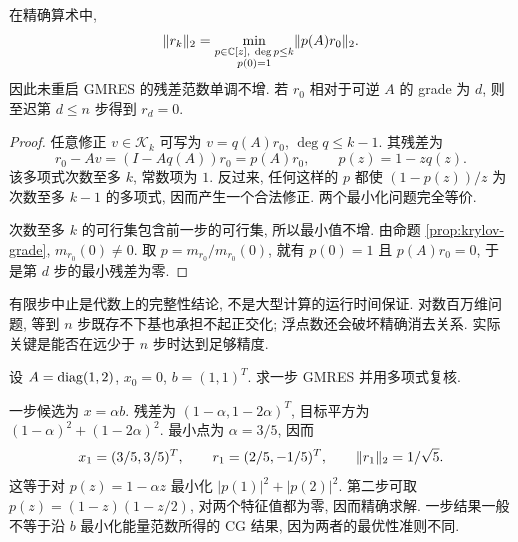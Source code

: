 \begin{theorem}\label{thm:gmres-polynomial}
在精确算术中,
\begin{equation}\label{eq:gmres-poly-min}
\lVert r_k\rVert_2=
\min_{\substack{p\in\mathbb C[z],\ \deg p\le k\\p(0)=1}}
\lVert p(A)r_0\rVert_2.
\end{equation}
因此未重启 GMRES 的残差范数单调不增. 若 $r_0$ 相对于可逆 $A$ 的 grade 为 $d$, 则至迟第 $d\le n$ 步得到 $r_d=0$.
\end{theorem}
\begin{proof}
任意修正 $v\in\mathcal K_k$ 可写为 $v=q(A)r_0$, $\deg q\le k-1$. 其残差为
\[
r_0-Av=(I-Aq(A))r_0=p(A)r_0,\qquad p(z)=1-zq(z).
\]
该多项式次数至多 $k$, 常数项为 $1$. 反过来, 任何这样的 $p$ 都使 $(1-p(z))/z$ 为次数至多 $k-1$ 的多项式, 因而产生一个合法修正. 两个最小化问题完全等价.

次数至多 $k$ 的可行集包含前一步的可行集, 所以最小值不增. 由命题 \ref{prop:krylov-grade}, $m_{r_0}(0)\ne0$. 取 $p=m_{r_0}/m_{r_0}(0)$, 就有 $p(0)=1$ 且 $p(A)r_0=0$, 于是第 $d$ 步的最小残差为零.
\end{proof}
有限步中止是代数上的完整性结论, 不是大型计算的运行时间保证. 对数百万维问题, 等到 $n$ 步既存不下基也承担不起正交化; 浮点数还会破坏精确消去关系. 实际关键是能否在远少于 $n$ 步时达到足够精度.

\begin{example}
设 $A=\operatorname{diag}(1,2)$, $x_0=0$, $b=(1,1)^T$. 求一步 GMRES 并用多项式复核.
\end{example}
\begin{solution}
一步候选为 $x=\alpha b$. 残差为 $(1-\alpha,1-2\alpha)^T$, 目标平方为
$(1-\alpha)^2+(1-2\alpha)^2$. 最小点为 $\alpha=3/5$, 因而
\[
x_1=(3/5,3/5)^T,\qquad r_1=(2/5,-1/5)^T,\qquad
\lVert r_1\rVert_2=1/\sqrt5.
\]
这等于对 $p(z)=1-\alpha z$ 最小化 $|p(1)|^2+|p(2)|^2$. 第二步可取
$p(z)=(1-z)(1-z/2)$, 对两个特征值都为零, 因而精确求解. 一步结果一般不等于沿 $b$ 最小化能量范数所得的 CG 结果, 因为两者的最优性准则不同.
\end{solution}

